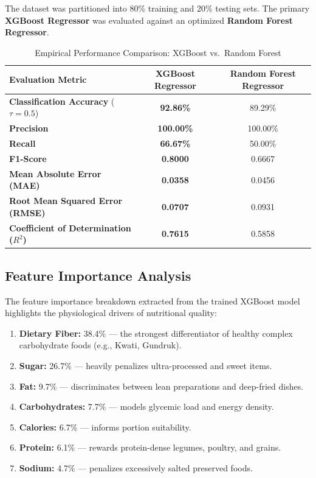 \documentclass[12pt,a4paper]{report}
\begin{document}
The dataset was partitioned into 80\% training and 20\% testing sets. The primary \textbf{XGBoost Regressor} was evaluated against an optimized \textbf{Random Forest Regressor}.

\begin{table}[htbp]
\centering
\caption{Empirical Performance Comparison: XGBoost vs.\ Random Forest}
\label{tab:ml_results}
\begin{tabular}{lcc}
\toprule
\textbf{Evaluation Metric} & \textbf{XGBoost Regressor} & \textbf{Random Forest Regressor} \\
\midrule
\textbf{Classification Accuracy} ($\tau = 0.5$) & \textbf{92.86\%} & 89.29\% \\
\textbf{Precision} & \textbf{100.00\%} & 100.00\% \\
\textbf{Recall} & \textbf{66.67\%} & 50.00\% \\
\textbf{F1-Score} & \textbf{0.8000} & 0.6667 \\
\midrule
\textbf{Mean Absolute Error (MAE)} & \textbf{0.0358} & 0.0456 \\
\textbf{Root Mean Squared Error (RMSE)} & \textbf{0.0707} & 0.0931 \\
\textbf{Coefficient of Determination ($R^2$)} & \textbf{0.7615} & 0.5858 \\
\bottomrule
\end{tabular}
\end{table}

\subsection{Feature Importance Analysis}
The feature importance breakdown extracted from the trained XGBoost model highlights the physiological drivers of nutritional quality:
\begin{enumerate}
  \item \textbf{Dietary Fiber:} 38.4\% --- the strongest differentiator of healthy complex carbohydrate foods (e.g., Kwati, Gundruk).
  \item \textbf{Sugar:} 26.7\% --- heavily penalizes ultra-processed and sweet items.
  \item \textbf{Fat:} 9.7\% --- discriminates between lean preparations and deep-fried dishes.
  \item \textbf{Carbohydrates:} 7.7\% --- models glycemic load and energy density.
  \item \textbf{Calories:} 6.7\% --- informs portion suitability.
  \item \textbf{Protein:} 6.1\% --- rewards protein-dense legumes, poultry, and grains.
  \item \textbf{Sodium:} 4.7\% --- penalizes excessively salted preserved foods.
\end{enumerate}
\end{document}

